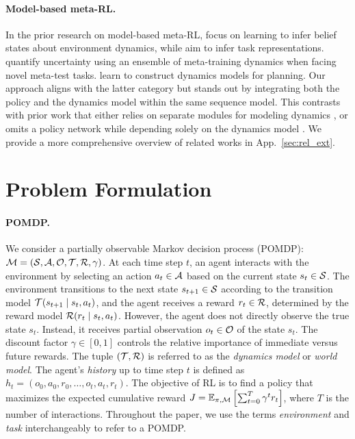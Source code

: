 \documentclass{article}
\begin{document}
\paragraph*{Model-based meta-RL.}
In the prior research on model-based meta-RL,
\cite{VariBAD,HyperX,BOReL} focus on learning to infer belief states about environment dynamics, while \citet{MoSS} aim to infer task representations.
\citet{IDAQ} quantify uncertainty using an ensemble of meta-training dynamics when facing novel meta-test tasks.
\citet{ReBAL,TFsearch,MAMBA} learn to construct dynamics models for planning.
Our approach aligns with the latter category but stands out by integrating both the policy and the dynamics model within the same sequence model.
This contrasts with prior work that either relies on separate modules for modeling dynamics \citep{ReBAL,MAMBA}, or omits a policy network while depending solely on the dynamics model \citep{TFsearch}.
We provide a more comprehensive overview of related works in App.~\ref{sec:rel_ext}.


\section{Problem Formulation}
\label{sec:back}

\paragraph*{POMDP.}
We consider a partially observable Markov decision process (POMDP): ${\mathcal{M}} = ({\mathcal{S}}, {\mathcal{A}}, {\mathcal{O}}, {\mathcal{T}}, {\mathcal{R}}, \gamma)$.
At each time step $t$, an agent interacts with the environment by selecting an action $a_t \in {\mathcal{A}}$ based on the current state $s_t \in {\mathcal{S}}$.
The environment transitions to the next state $s_{t+1} \in {\mathcal{S}}$ according to the transition model ${\mathcal{T}}(s_{t+1} \mid s_t, a_t)$, and the agent receives a reward $r_t \in {\mathcal{R}}$, determined by the reward model ${\mathcal{R}}(r_t \mid s_t, a_t)$.
However, the agent does not directly observe the true state $s_t$.
Instead, it receives partial observation $o_t \in {\mathcal{O}}$ of the state $s_t$.
The discount factor $\gamma \in [0, 1]$ controls the relative importance of immediate versus future rewards.
The tuple $({\mathcal{T}}, {\mathcal{R}})$ is referred to as the \emph{dynamics model} or \emph{world model}.
The agent's \emph{history} up to time step $t$ is defined as $h_t = (o_0, a_0, r_0, \dots, o_t, a_t, r_t)$.
The objective of RL is to find a policy that maximizes the expected cumulative reward $J = \mathbb{E}_{\pi,{\mathcal{M}}} \left[ \sum_{t=0}^T \gamma^t r_t \right]$, where $T$ is the  number of interactions.
Throughout the paper, we use the terms \emph{environment} and \emph{task} interchangeably to refer to a POMDP.
\end{document}
